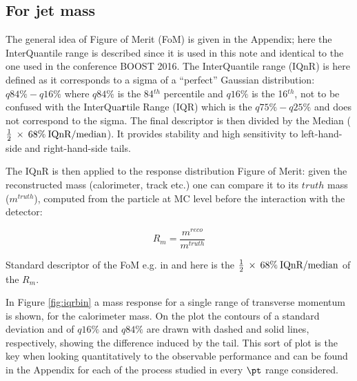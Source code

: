 


\subsection{For jet mass}
The general idea of Figure of Merit (FoM) is given in the Appendix; here the InterQuantile range is described since it is used in this note and identical to the one used in the conference BOOST 2016.
The InterQuantile range (IQnR) is here defined as it corresponds to a sigma of a ``perfect'' Gaussian distribution: $q84\%-q16\%$ where $q84\%$ is the 84$^{th}$ percentile and $q16\%$ is the 16$^{th}$, not to be confused with the InterQua\textbf{r}tile Range (IQR) which is the $q75\%-q25\%$ and does not correspond to the sigma. The final descriptor is then divided by the Median ($\frac{1}{2}\: \times\: 68\% \:\textrm{IQnR/median}$). It provides stability and high sensitivity to left-hand-side and right-hand-side tails.

The IQnR is then applied to the response distribution Figure of Merit: given the reconstructed mass (calorimeter, track etc.) one can compare it to its $truth$ mass ($m^{truth}$), computed from the particle at MC level before the interaction with the detector:

$$R_m=\frac{m^{reco}}{m^{truth}}$$

Standard descriptor of the FoM e.g. in \cite{art35} and here is the $\frac{1}{2}\: \times\: 68\% \:\textrm{IQnR/median}$ of the $R_m$.
  
  
In Figure \ref{fig:iqrbin} a mass response for a single range of transverse momentum is shown, for the calorimeter mass. On the plot the contours of a standard deviation and of $q16\%$ and $q84\%$ are drawn with dashed and solid lines, respectively, showing the difference induced by the tail. This sort of plot is the key when looking quantitatively to the observable performance and can be found in the Appendix for each of the process studied in every $\pt$ range considered. 

